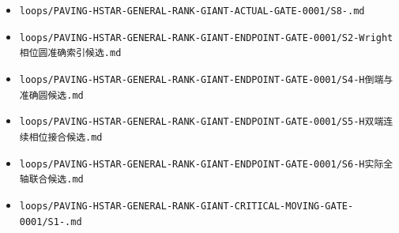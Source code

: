 \documentclass[10pt]{article}
\begin{document}
\begin{itemize}
\item \texttt{loops/\allowbreak{}PAVING-\allowbreak{}HSTAR-\allowbreak{}GENERAL-\allowbreak{}RANK-\allowbreak{}GIANT-\allowbreak{}ACTUAL-\allowbreak{}GATE-\allowbreak{}0001/\allowbreak{}S8-.\allowbreak{}md}
\item \texttt{loops/\allowbreak{}PAVING-\allowbreak{}HSTAR-\allowbreak{}GENERAL-\allowbreak{}RANK-\allowbreak{}GIANT-\allowbreak{}ENDPOINT-\allowbreak{}GATE-\allowbreak{}0001/\allowbreak{}S2-Wright{\cjkfont 相\allowbreak{}位\allowbreak{}圆\allowbreak{}准\allowbreak{}确\allowbreak{}索\allowbreak{}引\allowbreak{}候\allowbreak{}选}.\allowbreak{}md}
\item \texttt{loops/\allowbreak{}PAVING-\allowbreak{}HSTAR-\allowbreak{}GENERAL-\allowbreak{}RANK-\allowbreak{}GIANT-\allowbreak{}ENDPOINT-\allowbreak{}GATE-\allowbreak{}0001/\allowbreak{}S4-H{\cjkfont 倒\allowbreak{}端\allowbreak{}与\allowbreak{}准\allowbreak{}确\allowbreak{}圆\allowbreak{}候\allowbreak{}选}.\allowbreak{}md}
\item \texttt{loops/\allowbreak{}PAVING-\allowbreak{}HSTAR-\allowbreak{}GENERAL-\allowbreak{}RANK-\allowbreak{}GIANT-\allowbreak{}ENDPOINT-\allowbreak{}GATE-\allowbreak{}0001/\allowbreak{}S5-H{\cjkfont 双\allowbreak{}端\allowbreak{}连\allowbreak{}续\allowbreak{}相\allowbreak{}位\allowbreak{}接\allowbreak{}合\allowbreak{}候\allowbreak{}选}.\allowbreak{}md}
\item \texttt{loops/\allowbreak{}PAVING-\allowbreak{}HSTAR-\allowbreak{}GENERAL-\allowbreak{}RANK-\allowbreak{}GIANT-\allowbreak{}ENDPOINT-\allowbreak{}GATE-\allowbreak{}0001/\allowbreak{}S6-H{\cjkfont 实\allowbreak{}际\allowbreak{}全\allowbreak{}轴\allowbreak{}联\allowbreak{}合\allowbreak{}候\allowbreak{}选}.\allowbreak{}md}
\item \texttt{loops/\allowbreak{}PAVING-\allowbreak{}HSTAR-\allowbreak{}GENERAL-\allowbreak{}RANK-\allowbreak{}GIANT-\allowbreak{}CRITICAL-\allowbreak{}MOVING-\allowbreak{}GATE-\allowbreak{}0001/\allowbreak{}S1-.\allowbreak{}md}

\end{itemize}
\end{document}
